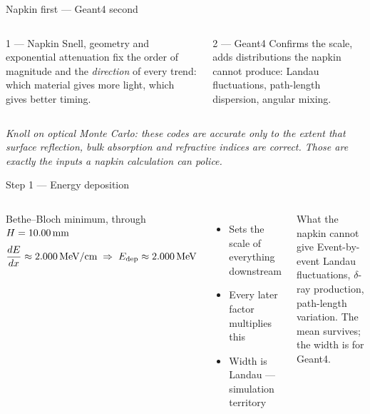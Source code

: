 \documentclass[aspectratio=169,9pt]{beamer}
\begin{document}
\begin{frame}{Napkin first — Geant4 second}
  \begin{columns}[T]
      \begin{block}{1 — Napkin}
        {\small Snell, geometry and exponential attenuation fix
        the order of magnitude and the \emph{direction} of every trend:
        which material gives more light, which gives better timing.}
      \end{block}
      \begin{block}{2 — Geant4}
        {\small Confirms the scale, adds distributions the napkin cannot produce:
        Landau fluctuations, path-length dispersion, angular mixing.}
      \end{block}
  \end{columns}
  \vspace{6pt}
  \begin{alertblock}{}
    {\small\itshape Knoll on optical Monte Carlo: these codes are accurate only to the
    extent that surface reflection, bulk absorption and refractive indices are correct.
    Those are exactly the inputs a napkin calculation can police.}
  \end{alertblock}
\end{frame}

\begin{frame}{Step 1 — Energy deposition}
  \begin{columns}[T]
      \begin{block}{Bethe–Bloch minimum, through $H = 10.00\,\text{mm}$}
        \[
          \frac{dE}{dx}\approx2.000\,\text{MeV/cm}
          \;\Rightarrow\;
          E_{\mathrm{dep}}\approx2.000\,\text{MeV}
        \]
      \end{block}
      \begin{itemize}\setlength\itemsep{3pt}
        \item Sets the scale of everything downstream
        \item Every later factor multiplies this \NapdEMeV
        \item Width is Landau — simulation territory
      \end{itemize}
      \begin{alertblock}{What the napkin cannot give}
        {\small Event-by-event Landau fluctuations, $\delta$-ray production,
        path-length variation.  The mean survives; the width is for Geant4.}
      \end{alertblock}
  \end{columns}
\end{frame}
\end{document}
